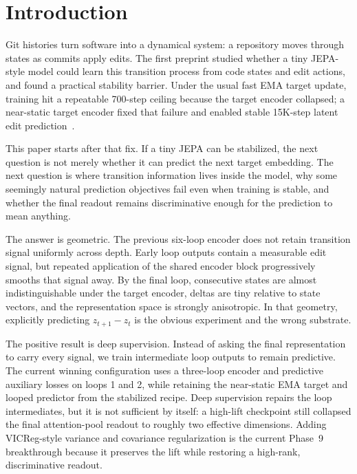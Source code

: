 \section{Introduction}
\label{sec:introduction}

Git histories turn software into a dynamical system: a repository moves
through states as commits apply edits.  The first \CodeWM{} preprint
studied whether a tiny JEPA-style model could learn this transition
process from code states and edit actions, and found a practical
stability barrier.  Under the usual fast EMA target update, training hit
a repeatable 700-step ceiling because the target encoder collapsed; a
near-static target encoder fixed that failure and enabled stable
15K-step latent edit prediction~\citep{akbulut2026collapse}.

This paper starts after that fix.  If a tiny JEPA can be stabilized, the
next question is not merely whether it can predict the next target
embedding.  The next question is where transition information lives
inside the model, why some seemingly natural prediction objectives fail
even when training is stable, and whether the final readout remains
discriminative enough for the prediction to mean anything.

The answer is geometric.  The previous six-loop encoder does not retain
transition signal uniformly across depth.  Early loop outputs contain a
measurable edit signal, but repeated application of the shared encoder
block progressively smooths that signal away.  By the final loop,
consecutive states are almost indistinguishable under the target
encoder, deltas are tiny relative to state vectors, and the representation
space is strongly anisotropic.  In that geometry, explicitly predicting
$z_{t+1}-z_t$ is the obvious experiment and the wrong substrate.

The positive result is deep supervision.  Instead of asking the final
representation to carry every signal, we train intermediate loop outputs
to remain predictive.  The current winning configuration uses a
three-loop encoder and predictive auxiliary losses on loops 1 and 2,
while retaining the near-static EMA target and looped predictor from the
stabilized \CodeWM{} recipe.  Deep supervision repairs the loop
intermediates, but it is not sufficient by itself: a high-lift
 checkpoint still collapsed the final attention-pool
readout to roughly two effective dimensions.  Adding VICReg-style
variance and covariance regularization is the current Phase~9
breakthrough because it preserves the lift while restoring a
high-rank, discriminative readout.

